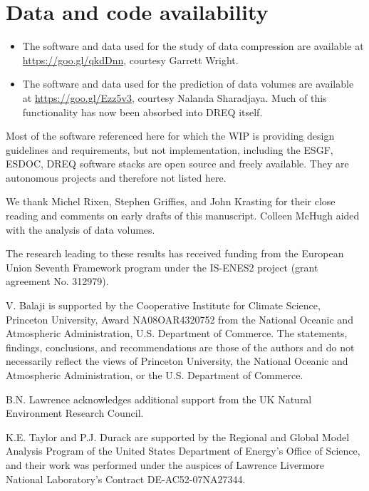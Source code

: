\documentclass[gmd,manuscript]{copernicus}
\begin{document}
\section{Data and code availability}
\label{sec:code}

\begin{itemize}
\item The software and data used for the study of data compression are
  available at \url{https://goo.gl/qkdDnn}, courtesy Garrett Wright.
\item The software and data used for the prediction of data volumes
  are available at \url{https://goo.gl/Ezz5v3}, courtesy Nalanda
  Sharadjaya. Much of this functionality has now been absorbed into
  DREQ itself.
\end{itemize}

Most of the software referenced here for which the WIP is providing
design guidelines and requirements, but not implementation, including
the ESGF, ESDOC, DREQ software stacks are open source and freely
available. They are autonomous projects and therefore not listed here.

\begin{acknowledgements}
  We thank Michel Rixen, Stephen Griffies, and John Krasting for their
  close reading and comments on early drafts of this manuscript.
  Colleen McHugh aided with the analysis of data volumes.
  
  The research leading to these results has received funding from the
  European Union Seventh Framework program under the IS-ENES2 project
  (grant agreement No. 312979).

  V. Balaji is supported by the Cooperative Institute for Climate
  Science, Princeton University, Award NA08OAR4320752 from the
  National Oceanic and Atmospheric Administration, U.S. Department of
  Commerce. The statements, findings, conclusions, and recommendations
  are those of the authors and do not necessarily reflect the views of
  Princeton University, the National Oceanic and Atmospheric
  Administration, or the U.S. Department of Commerce.

  B.N. Lawrence acknowledges additional support from the UK Natural
  Environment Research Council.
  
  K.E. Taylor and P.J. Durack are supported by the Regional and Global
  Model Analysis Program of the United States Department of Energy's
  Office of Science, and their work was performed under the auspices
  of Lawrence Livermore National Laboratory's Contract
  DE-AC52-07NA27344.
\end{acknowledgements}
\end{document}
